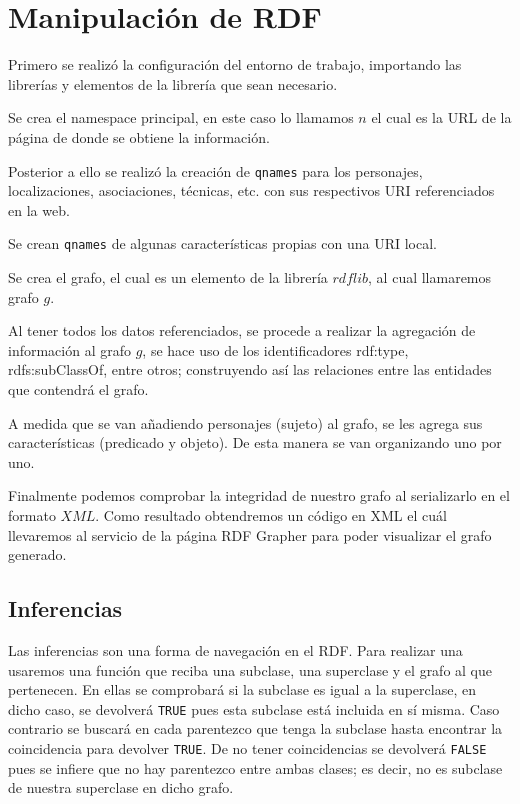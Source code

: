 \documentclass[conference]{IEEEtran}
\begin{document}
\section{Manipulación de RDF}

Primero se realizó la configuración del entorno de trabajo, importando las librerías y elementos de la librería que sean necesario.

Se crea el namespace principal, en este caso lo llamamos $n$ el cual es la URL de la página de donde se obtiene la información.

Posterior a ello se realizó la creación de \texttt{qnames} para los personajes, localizaciones, asociaciones, técnicas, etc. con sus respectivos URI referenciados en la web.

Se crean \texttt{qnames} de algunas características propias con una URI local.

Se crea el grafo, el cual es un elemento de la librería $rdflib$, al cual llamaremos grafo $g$.

Al tener todos los datos referenciados, se procede a realizar la agregación de información al grafo $g$, se hace uso de los identificadores rdf:type, rdfs:subClassOf, entre otros; construyendo así las relaciones entre las entidades que contendrá el grafo. 

A medida que se van añadiendo personajes (sujeto) al grafo, se les agrega sus características (predicado y objeto). De esta manera se van organizando uno por uno.

Finalmente podemos comprobar la integridad de nuestro grafo al serializarlo en el formato $XML$.
Como resultado obtendremos un código en XML el cuál llevaremos al servicio de la página RDF Grapher para poder visualizar el grafo generado.

\subsection{Inferencias}

Las inferencias son una forma de navegación en el RDF. Para realizar una usaremos una función que reciba una subclase, una superclase y el grafo al que pertenecen.
En ellas se comprobará si la subclase es igual a la superclase, en dicho caso, se devolverá \texttt{TRUE} pues esta subclase está incluida en sí misma. Caso contrario se buscará en cada parentezco que tenga la subclase hasta encontrar la coincidencia para devolver \texttt{TRUE}.
De no tener coincidencias se devolverá \texttt{FALSE} pues se infiere que no hay parentezco entre ambas clases; es decir, no es subclase de nuestra superclase en dicho grafo.
\end{document}
